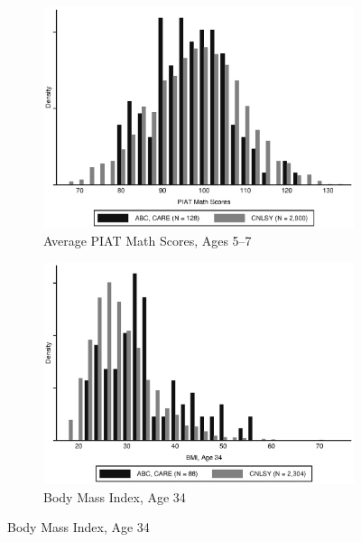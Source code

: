 \begin{figure}[H]
	\ContinuedFloat
	\begin{subfigure}[h]{0.8\textwidth}
	\centering
	\caption{Average PIAT Math Scores, Ages 5--7} \label{fig:support_math}
	\includegraphics[width=\textwidth]{AppOutput/Methodology/support_math.eps}
	\end{subfigure}
	
	\begin{subfigure}[h]{0.8\textwidth}
	\centering
	\caption{Body Mass Index, Age 34} \label{fig:support_bmi}
	\includegraphics[width=\textwidth]{AppOutput/Methodology/support_bmi.eps}
	\end{subfigure}
	
\end{figure}


